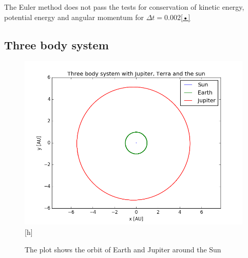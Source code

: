 The Euler method does not pass the tests for conservation of kinetic energy, potential energy and angular momentum for $\Delta t = 0.002$\ref{•}


\subsection{Three body system}
\begin{figure}[h]
\includegraphics[scale=0.7]{figures/three_body}[h]
\caption{The plot shows the orbit of Earth and Jupiter around the Sun }
\end{figure}



